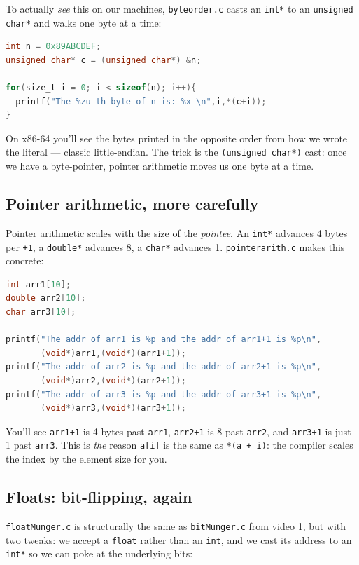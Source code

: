\documentclass[11pt]{article}
\begin{document}
To actually \emph{see} this on our machines, \texttt{byteorder.c}
casts an \texttt{int*} to an \texttt{unsigned char*} and walks one
byte at a time:

\begin{lstlisting}[language=C]
int n = 0x89ABCDEF;
unsigned char* c = (unsigned char*) &n;

for(size_t i = 0; i < sizeof(n); i++){
  printf("The %zu th byte of n is: %x \n",i,*(c+i));
}
\end{lstlisting}

On x86-64 you'll see the bytes printed in the opposite order from how
we wrote the literal --- classic little-endian. The trick is the
\texttt{(unsigned char*)} cast: once we have a byte-pointer, pointer
arithmetic moves us one byte at a time.

\subsection*{Pointer arithmetic, more carefully}

Pointer arithmetic scales with the size of the \emph{pointee}. An
\texttt{int*} advances 4 bytes per \texttt{+1}, a \texttt{double*}
advances 8, a \texttt{char*} advances 1. \texttt{pointerarith.c} makes
this concrete:

\begin{lstlisting}[language=C]
int arr1[10];
double arr2[10];
char arr3[10];

printf("The addr of arr1 is %p and the addr of arr1+1 is %p\n",
       (void*)arr1,(void*)(arr1+1));
printf("The addr of arr2 is %p and the addr of arr2+1 is %p\n",
       (void*)arr2,(void*)(arr2+1));
printf("The addr of arr3 is %p and the addr of arr3+1 is %p\n",
       (void*)arr3,(void*)(arr3+1));
\end{lstlisting}

You'll see \texttt{arr1+1} is 4 bytes past \texttt{arr1},
\texttt{arr2+1} is 8 past \texttt{arr2}, and \texttt{arr3+1} is just 1
past \texttt{arr3}. This is \emph{the} reason \texttt{a[i]} is the
same as \texttt{*(a + i)}: the compiler scales the index by the
element size for you.

\subsection*{Floats: bit-flipping, again}

\texttt{floatMunger.c} is structurally the same as
\texttt{bitMunger.c} from video 1, but with two tweaks: we accept a
\texttt{float} rather than an \texttt{int}, and we cast its address
to an \texttt{int*} so we can poke at the underlying bits:
\end{document}
